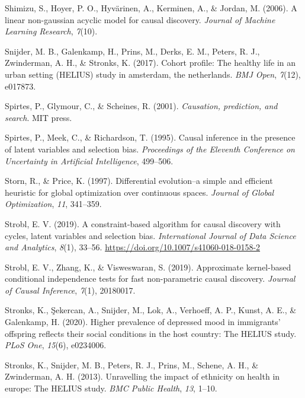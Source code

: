 \documentclass[
]{article}
\newlength{\cslhangindent}
\newenvironment{CSLReferences}[2] %
 {\begin{list}{}{%
  \setlength{\itemindent}{0pt}
  \setlength{\leftmargin}{0pt}
  \setlength{\parsep}{0pt}
  \ifodd #1
   \setlength{\leftmargin}{\cslhangindent}
   \setlength{\itemindent}{-1\cslhangindent}
  \fi
  \setlength{\itemsep}{#2\baselineskip}}}
 {\end{list}}
\begin{document}
\begin{CSLReferences}{1}{0}
Shimizu, S., Hoyer, P. O., Hyvärinen, A., Kerminen, A., \& Jordan, M.
(2006). A linear non-gaussian acyclic model for causal discovery.
\emph{Journal of Machine Learning Research}, \emph{7}(10).

Snijder, M. B., Galenkamp, H., Prins, M., Derks, E. M., Peters, R. J.,
Zwinderman, A. H., \& Stronks, K. (2017). Cohort profile: The healthy
life in an urban setting (HELIUS) study in amsterdam, the netherlands.
\emph{BMJ Open}, \emph{7}(12), e017873.

Spirtes, P., Glymour, C., \& Scheines, R. (2001). \emph{Causation,
prediction, and search}. MIT press.

Spirtes, P., Meek, C., \& Richardson, T. (1995). Causal inference in the
presence of latent variables and selection bias. \emph{Proceedings of
the {Eleventh} Conference on {Uncertainty} in Artificial Intelligence},
499--506.

Storn, R., \& Price, K. (1997). Differential evolution--a simple and
efficient heuristic for global optimization over continuous spaces.
\emph{Journal of Global Optimization}, \emph{11}, 341--359.

Strobl, E. V. (2019). A constraint-based algorithm for causal discovery
with cycles, latent variables and selection bias. \emph{International
Journal of Data Science and Analytics}, \emph{8}(1), 33--56.
\url{https://doi.org/10.1007/s41060-018-0158-2}

Strobl, E. V., Zhang, K., \& Visweswaran, S. (2019). Approximate
kernel-based conditional independence tests for fast non-parametric
causal discovery. \emph{Journal of Causal Inference}, \emph{7}(1),
20180017.

Stronks, K., Şekercan, A., Snijder, M., Lok, A., Verhoeff, A. P., Kunst,
A. E., \& Galenkamp, H. (2020). Higher prevalence of depressed mood in
immigrants' offspring reflects their social conditions in the host
country: The HELIUS study. \emph{PLoS One}, \emph{15}(6), e0234006.

Stronks, K., Snijder, M. B., Peters, R. J., Prins, M., Schene, A. H., \&
Zwinderman, A. H. (2013). Unravelling the impact of ethnicity on health
in europe: The HELIUS study. \emph{BMC Public Health}, \emph{13}, 1--10.


\end{CSLReferences}
\end{document}

